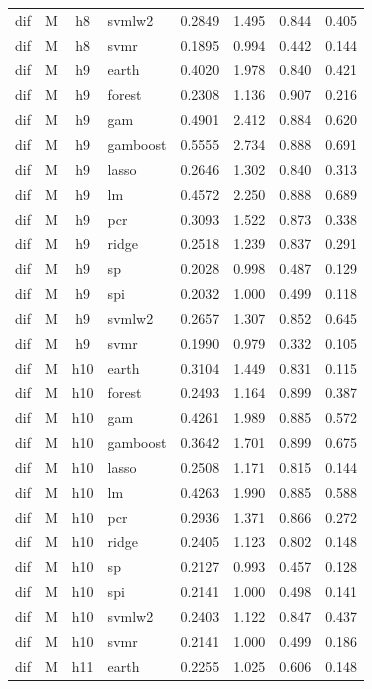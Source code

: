 \begin{ThreePartTable}
\begin{longtable}[t]{llclcccc}
dif & M & h8 & svmlw2 & 0.2849 & 1.495 & 0.844 & 0.405\\
dif & M & h8 & svmr & 0.1895 & 0.994 & 0.442 & 0.144\\
\addlinespace
dif & M & h9 & earth & 0.4020 & 1.978 & 0.840 & 0.421\\
dif & M & h9 & forest & 0.2308 & 1.136 & 0.907 & 0.216\\
dif & M & h9 & gam & 0.4901 & 2.412 & 0.884 & 0.620\\
dif & M & h9 & gamboost & 0.5555 & 2.734 & 0.888 & 0.691\\
dif & M & h9 & lasso & 0.2646 & 1.302 & 0.840 & 0.313\\
dif & M & h9 & lm & 0.4572 & 2.250 & 0.888 & 0.689\\
dif & M & h9 & pcr & 0.3093 & 1.522 & 0.873 & 0.338\\
dif & M & h9 & ridge & 0.2518 & 1.239 & 0.837 & 0.291\\
dif & M & h9 & sp & 0.2028 & 0.998 & 0.487 & 0.129\\
dif & M & h9 & spi & 0.2032 & 1.000 & 0.499 & 0.118\\
dif & M & h9 & svmlw2 & 0.2657 & 1.307 & 0.852 & 0.645\\
dif & M & h9 & svmr & 0.1990 & 0.979 & 0.332 & 0.105\\
\addlinespace
dif & M & h10 & earth & 0.3104 & 1.449 & 0.831 & 0.115\\
dif & M & h10 & forest & 0.2493 & 1.164 & 0.899 & 0.387\\
dif & M & h10 & gam & 0.4261 & 1.989 & 0.885 & 0.572\\
dif & M & h10 & gamboost & 0.3642 & 1.701 & 0.899 & 0.675\\
dif & M & h10 & lasso & 0.2508 & 1.171 & 0.815 & 0.144\\
dif & M & h10 & lm & 0.4263 & 1.990 & 0.885 & 0.588\\
dif & M & h10 & pcr & 0.2936 & 1.371 & 0.866 & 0.272\\
dif & M & h10 & ridge & 0.2405 & 1.123 & 0.802 & 0.148\\
dif & M & h10 & sp & 0.2127 & 0.993 & 0.457 & 0.128\\
dif & M & h10 & spi & 0.2141 & 1.000 & 0.498 & 0.141\\
dif & M & h10 & svmlw2 & 0.2403 & 1.122 & 0.847 & 0.437\\
dif & M & h10 & svmr & 0.2141 & 1.000 & 0.499 & 0.186\\
\addlinespace
dif & M & h11 & earth & 0.2255 & 1.025 & 0.606 & 0.148\\

\end{longtable}
\end{ThreePartTable}
